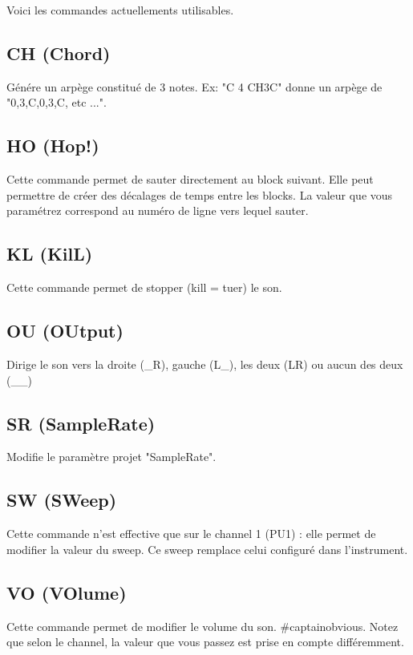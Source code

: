 
Voici les commandes actuellements utilisables.

\subsection{CH (Chord)}


Génére un arpège constitué de 3 notes. Ex: "C 4 CH3C" donne un arpège de "0,3,C,0,3,C, etc ...".

\subsection{HO (Hop!)}

Cette commande permet de sauter directement au block suivant.
Elle peut permettre de créer des décalages de temps entre les blocks.
La valeur que vous paramétrez correspond au numéro de ligne vers lequel sauter.

\subsection{KL (KilL)}

Cette commande permet de stopper (kill = tuer) le son.


\subsection{OU (OUtput)}

Dirige le son vers la droite (\_R), gauche (L\_), les deux (LR) ou aucun des deux (\_\_)

\subsection{SR (SampleRate)}

Modifie le paramètre projet "SampleRate".

\subsection{SW (SWeep)}

Cette commande n'est effective que sur le channel 1 (PU1) : elle permet de modifier la valeur du sweep.
Ce sweep remplace celui configuré dans l'instrument.

\subsection{VO (VOlume)}

Cette commande permet de modifier le volume du son.
\#captainobvious.
Notez que selon le channel, la valeur que vous passez est prise en compte différemment.
